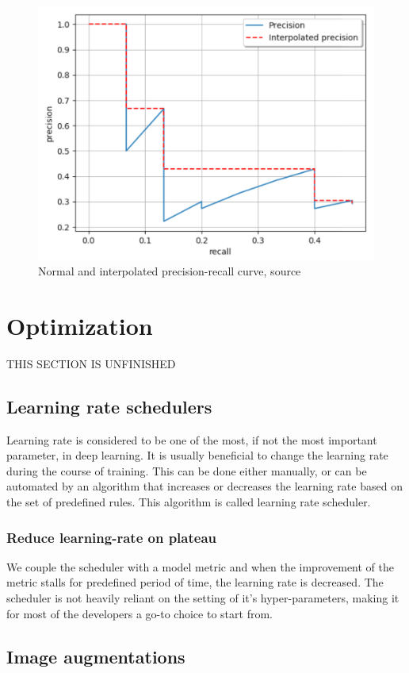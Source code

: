 \begin{figure}
    \includegraphics[width = \linewidth]{images/PR-curve.png}
    \caption{Normal and interpolated precision-recall curve, source \cite{Padilla2020}}
    \label{fig:pr_curve}
\end{figure}




\section{Optimization}
THIS SECTION IS UNFINISHED
\subsection{Learning rate schedulers}
Learning rate is considered to be one of the most, if not the most important parameter, in deep learning. It is usually beneficial to change the learning rate during the course of training. This can be done either manually, or can be automated by an algorithm that increases or decreases the learning rate based on the set of predefined rules. This algorithm is called learning rate scheduler.

\subsubsection{Reduce learning-rate on plateau}
We couple the scheduler with a model metric and when the improvement of the metric stalls for predefined period of time, the learning rate is decreased.
The scheduler is not heavily reliant on the setting of it's hyper-parameters, making it for most of the developers a go-to choice to start from.

\subsection{Image augmentations}



